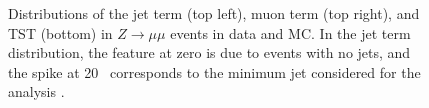 \begin{centering}
\begin{figure}[!hbt]
\caption{ Distributions of the jet term (top left), muon term (top right), and \ac{TST} (bottom) \met in $Z\rightarrow\mu\mu$ events in data and \ac{MC}. In the jet term distribution, the feature at zero is due to events with no jets, and the spike at 20 \gev~corresponds to the minimum jet \pt considered for the analysis \cite{ATL-PHYS-PUB-2015-027}. }
\label{fig:reco_met_terms}
\end{figure}
\end{centering}




